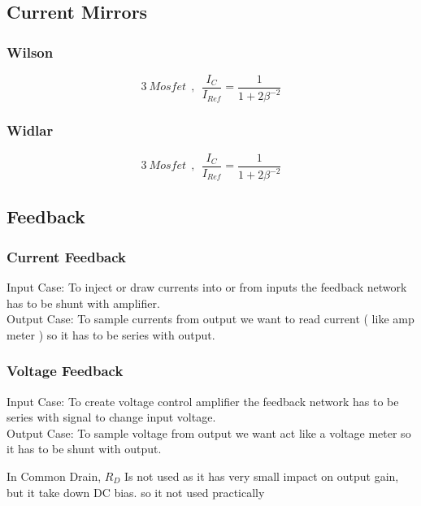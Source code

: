 \subsection{Current Mirrors}
\subsubsection{Wilson}
$$ 3~Mosfet ~~ , ~~ \frac{I_C}{I_{Ref}} = \frac{1}{1 + 2 \beta ^ {-2}} $$
\par
\subsubsection{Widlar}
$$ 3~Mosfet ~~ , ~~ \frac{I_C}{I_{Ref}} = \frac{1}{1 + 2 \beta ^ {-2}} $$
\par
\subsection{Feedback}
\subsubsection{Current Feedback}
Input Case: To inject or draw currents into or from inputs the feedback network has to be shunt with amplifier.\\
Output Case: To sample currents from output we want to read current ( like amp meter ) so it has to be series with output.\\
\lipsum[7-8]
\subsubsection{Voltage Feedback}
Input Case: To create voltage control amplifier the feedback network has to be series with signal to change input voltage.\\
Output Case: To sample voltage from output we want act like a voltage meter so it has to be shunt with output.
\par
\setlength{\parindent}{0.5cm} %
In Common Drain, $R_D$ Is not used as it has very small impact on output gain, but it take down DC bias. so it not used practically
\lipsum[1]
\setlength{\parindent}{0.0cm} 
